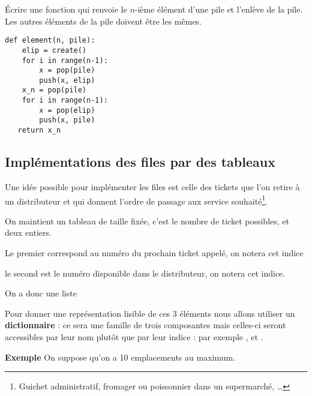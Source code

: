 \begin{Exercise}[title = {n-ième élément d'une pile}]\it

Écrire une fonction  qui renvoie le $n$-ième élément d'une pile et l'enlève de la pile. Les autres éléments de la pile doivent être les mêmes.
\end{Exercise} 
\begin{Answer}
\begin{lstlisting}
def element(n, pile):
    elip = create()
    for i in range(n-1):
        x = pop(pile)
        push(x, elip)
    x_n = pop(pile)
    for i in range(n-1):
        x = pop(elip)
        push(x, pile)
   return x_n
\end{lstlisting}
\end{Answer}
\subsection{Implémentations des files par des tableaux}
Une idée possible pour implémenter les files est celle des tickets que l'on retire à un distributeur et qui donnent l'ordre de passage aux service souhaité\footnote{Guichet administratif, fromager ou poissonnier dans un supermarché, \dots}.

On maintient un tableau de taille fixée, c'est le nombre de ticket possibles, et deux entiers. 

Le premier correspond au numéro du prochain ticket appelé, on notera  cet indice

le second est le numéro disponible dans le distributeur, on notera  cet indice. 

On a donc une liste 

Pour donner une représentation lisible de ces 3 éléments nous allons utiliser un {\bf dictionnaire} : ce sera une famille de trois composantes mais celles-ci seront accessibles par leur nom plutôt que par leur indice : par exemple ,   et .

\newpage

{\bf  Exemple} On suppose qu'on a 10 emplacements au maximum.

